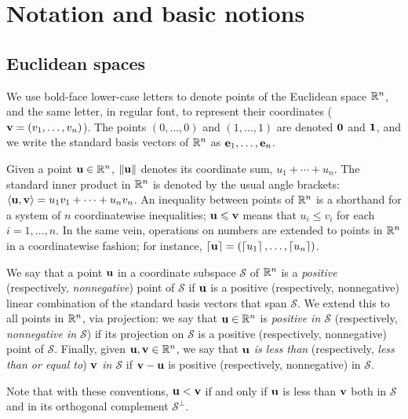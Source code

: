 \documentclass{amsart}
\begin{document}
\section{Notation and basic notions}

\subsection{Euclidean spaces}
\label{ss: euclidean spaces and convexity}
We use bold-face lower-case letters to denote points of the Euclidean space $\mathbb{R}^n$, and the same letter, in regular font, to represent their coordinates (\eg $\mathbf{v}=(v_1,\ldots,v_n)$).
The points $(0,\ldots,0)$ and $(1,\ldots,1)$ are denoted $\mathbf{0}$ and $\mathbf{1}$, and we write the standard basis vectors of $\mathbb{R}^n$ as $\mathbf{e}_1,\ldots,\mathbf{e}_n$.

Given a point $\mathbf{u}\in \mathbb{R}^n$, $\| \mathbf{u} \|$ denotes its coordinate sum, $u_1+\cdots+u_n$.
The standard inner product in $\mathbb{R}^n$ is denoted by the usual angle brackets: $\langle \mathbf{u}, \mathbf{v} \rangle = u_1v_1 + \cdots + u_nv_n$.
An inequality between points of $\mathbb{R}^n$ is a shorthand for a system of $n$ coordinatewise inequalities; \eg $\mathbf{u}\leqslant \mathbf{v}$ means that $u_i \le v_i$ for each $i=1,\ldots,n$.
In the same vein, operations on numbers are extended to points in $\mathbb{R}^n$ in a coordinatewise fashion; for instance, $\left\lceil \mathbf{u} \right\rceil=(\left\lceil u_1 \right\rceil,\ldots,\left\lceil u_n \right\rceil)$.

We say that a point $\mathbf{u}$ in a coordinate subspace $\mathcal{S}$ of $\mathbb{R}^n$ is a \emph{positive} (respectively, \emph{nonnegative}) point of $\mathcal{S}$ if $\mathbf{u}$ is a positive (respectively, nonnegative) linear combination of the standard basis vectors that span $\mathcal{S}$.
We extend this to all points in $\mathbb{R}^n$, via projection: we say that $\mathbf{u} \in \mathbb{R}^n$ is \emph{positive in $\mathcal{S}$} (respectively, \emph{nonnegative in $\mathcal{S}$}) if its projection on $\mathcal{S}$ is a positive (respectively, nonnegative) point of $\mathcal{S}$.
Finally, given $\mathbf{u},\mathbf{v}\in \mathbb{R}^n$, we say that \emph{$\mathbf{u}$ is less than} (respectively, \emph{less than or equal to}) \emph{$\mathbf{v}$ in $\mathcal{S}$} if $\mathbf{v}-\mathbf{u}$ is positive (respectively, nonnegative) in $\mathcal{S}$.

Note that with these conventions, $\mathbf{u} < \mathbf{v}$ if and only if $\mathbf{u}$ is less than $\mathbf{v}$ both in $\mathcal{S}$ and in its orthogonal complement $\mathcal{S}^\perp$.
\end{document}
